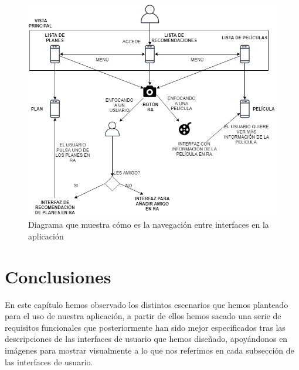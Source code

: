 \begin{figure}[H]
    \centering
    \includegraphics[width=6in]{figures/chapter-3/Navegacion.png}
    \caption{Diagrama que muestra cómo es la navegación entre interfaces en la aplicación}
    \label{fig:navegacion}
\end{figure}

\section{Conclusiones}
En este capítulo hemos observado los distintos escenarios que hemos planteado para el uso de nuestra aplicación, a partir de ellos hemos sacado una serie de 
 requisitos funcionales que posteriormente han sido mejor especificados tras las descripciones de las interfaces de usuario que hemos diseñado, apoyándonos en imágenes 
 para mostrar visualmente a lo que nos referimos en cada subsección de las interfaces de usuario.



